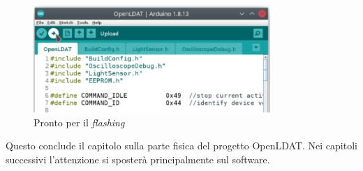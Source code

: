 \begin{figure}[H]
	\centering
	\includegraphics[width=0.8\textwidth]{Dispositivo_files/flashing_05.png}
	\caption{Pronto per il \textit{flashing}}
	\label{fig:flashing_05}
\end{figure}

Questo conclude il capitolo sulla parte fisica del progetto OpenLDAT. Nei capitoli successivi l'attenzione si sposterà principalmente sul software. %
